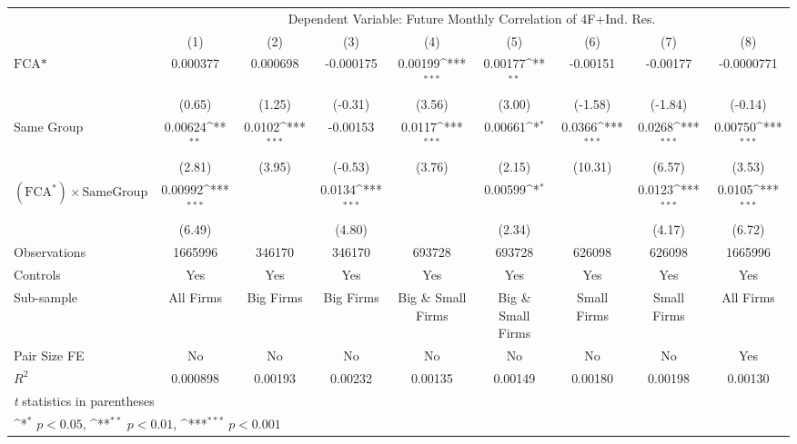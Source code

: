 {
\def\sym#1{\ifmmode^{#1}\else\(^{#1}\)\fi}
\begin{tabular}{l*{8}{c}}
\hline\hline
                &\multicolumn{8}{c}{Dependent Variable: Future Monthly Correlation of 4F+Ind. Res.}                                                                     \\\cmidrule(lr){2-9}
                &\multicolumn{1}{c}{(1)}         &\multicolumn{1}{c}{(2)}         &\multicolumn{1}{c}{(3)}         &\multicolumn{1}{c}{(4)}         &\multicolumn{1}{c}{(5)}         &\multicolumn{1}{c}{(6)}         &\multicolumn{1}{c}{(7)}         &\multicolumn{1}{c}{(8)}         \\
\hline
$ \text{FCA*} $ & 0.000377         & 0.000698         &-0.000175         &  0.00199\sym{***}&  0.00177\sym{**} & -0.00151         & -0.00177         &-0.0000771         \\
                &   (0.65)         &   (1.25)         &  (-0.31)         &   (3.56)         &   (3.00)         &  (-1.58)         &  (-1.84)         &  (-0.14)         \\
[1em]
Same Group      &  0.00624\sym{**} &   0.0102\sym{***}& -0.00153         &   0.0117\sym{***}&  0.00661\sym{*}  &   0.0366\sym{***}&   0.0268\sym{***}&  0.00750\sym{***}\\
                &   (2.81)         &   (3.95)         &  (-0.53)         &   (3.76)         &   (2.15)         &  (10.31)         &   (6.57)         &   (3.53)         \\
[1em]
 $ (\text{FCA}^*) \times {\text{SameGroup} }  $ &  0.00992\sym{***}&                  &   0.0134\sym{***}&                  &  0.00599\sym{*}  &                  &   0.0123\sym{***}&   0.0105\sym{***}\\
                &   (6.49)         &                  &   (4.80)         &                  &   (2.34)         &                  &   (4.17)         &   (6.72)         \\
\hline
Observations    &  1665996         &   346170         &   346170         &   693728         &   693728         &   626098         &   626098         &  1665996         \\
Controls        &      Yes         &      Yes         &      Yes         &      Yes         &      Yes         &      Yes         &      Yes         &      Yes         \\
Sub-sample      &All Firms         &Big Firms         &Big Firms         &Big \& Small Firms         &Big \& Small Firms         &Small Firms         &Small Firms         &All Firms         \\
Pair Size FE    &       No         &       No         &       No         &       No         &       No         &       No         &       No         &      Yes         \\
$ R^2 $         & 0.000898         &  0.00193         &  0.00232         &  0.00135         &  0.00149         &  0.00180         &  0.00198         &  0.00130         \\
\hline\hline
\multicolumn{9}{l}{\footnotesize \textit{t} statistics in parentheses}\\
\multicolumn{9}{l}{\footnotesize \sym{*} \(p<0.05\), \sym{**} \(p<0.01\), \sym{***} \(p<0.001\)}\\
\end{tabular}
}
